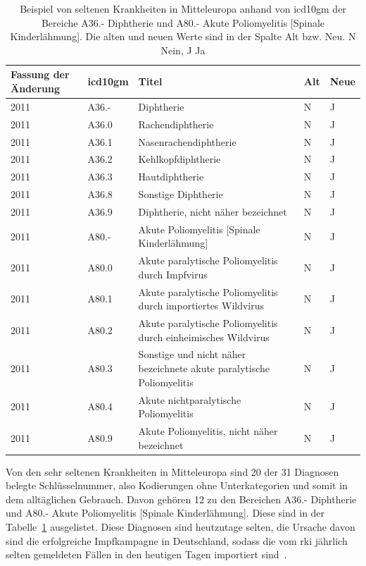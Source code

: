 \begin{table}[ht]
	\centering
	\caption[Beispiel von seltenen Krankheiten in Mitteleuropa (Diphtherie und Poliomyelitis)]{Beispiel von seltenen Krankheiten in Mitteleuropa anhand von \ac{icd10gm} der Bereiche \textsf{A36.-} \textsf{Diphtherie} und \textsf{A80.-} \textsf{Akute Poliomyelitis [Spinale Kinderlähmung]}. Die alten und neuen Werte sind in der Spalte \glqq Alt\grqq{} bzw. \glqq Neu\grqq{}. \textsf{N} Nein, \textsf{J} Ja}
	\label{tab:icdeuropa}
	\begin{tabular}{|p{1.6cm}|l|p{7cm}|l|l|}
		\hline
		\rowcolor{lightgray} Fassung der Änderung & \ac{icd10gm} & Titel & Alt & Neue \\ \hline
		\rowcolor{maroon!10} 2011 & A36.- & Diphtherie & N & J \\ \hline
		2011 & A36.0 & Rachendiphtherie & N & J \\ \hline
		2011 & A36.1 & Nasenrachendiphtherie & N & J \\ \hline
		2011 & A36.2 & Kehlkopfdiphtherie & N & J \\ \hline
		2011 & A36.3 & Hautdiphtherie & N & J \\ \hline
		2011 & A36.8 & Sonstige Diphtherie & N & J \\ \hline
		2011 & A36.9 & Diphtherie, nicht näher bezeichnet & N & J \\ \hline \hline
		\rowcolor{maroon!10} 2011 & A80.- & Akute Poliomyelitis [Spinale Kinderlähmung] & N & J \\ \hline
		2011 & A80.0 & Akute paralytische Poliomyelitis durch Impfvirus & N & J \\ \hline
		2011 & A80.1 & Akute paralytische Poliomyelitis durch importiertes Wildvirus & N & J \\ \hline
		2011 & A80.2 & Akute paralytische Poliomyelitis durch einheimisches Wildvirus & N & J \\ \hline
		2011 & A80.3 & Sonstige und nicht näher bezeichnete akute paralytische Poliomyelitis & N & J \\ \hline
		2011 & A80.4 & Akute nichtparalytische Poliomyelitis & N & J \\ \hline
		2011 & A80.9 & Akute Poliomyelitis, nicht näher bezeichnet & N & J \\ \hline
	\end{tabular}
\end{table}

Von den sehr seltenen Krankheiten in Mitteleuropa sind \textsf{20} der \textsf{31} Diagnosen belegte Schlüsselnummer, also Kodierungen ohne Unterkategorien und somit in dem alltäglichen  Gebrauch. Davon gehören \textsf{12} zu den Bereichen \textsf{A36.-} \textsf{Diphtherie} und \textsf{A80.-} \textsf{Akute Poliomyelitis [Spinale Kinderlähmung]}. Diese sind in der Tabelle~\ref{tab:icdeuropa} ausgelistet. Diese Diagnosen sind heutzutage selten, die Ursache davon sind die erfolgreiche Impfkampagne in Deutschland, sodass die vom \ac{rki} jährlich selten gemeldeten Fällen in den heutigen Tagen importiert sind~\cite{dippol1}.

